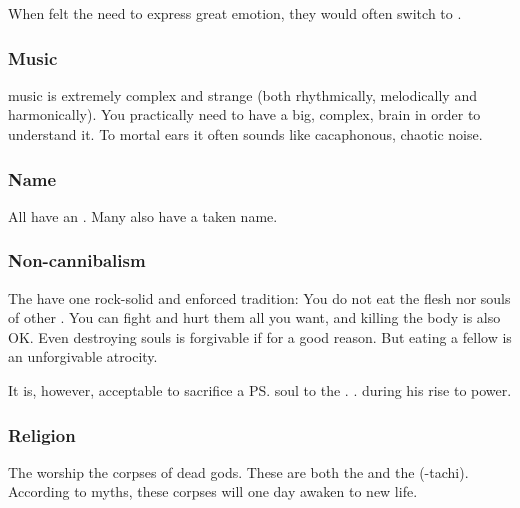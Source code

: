 When \dragons felt the need to express great emotion, they would often switch to \TrueDraconic. 





\subsubsection{Music}
\Draconic{} music is extremely complex and strange (both rhythmically, melodically and harmonically). 
You practically need to have a big, complex, \draconic{} brain in order to understand it. 
To mortal ears it often sounds like cacaphonous, chaotic noise. 





\subsubsection{Name}
All \dragons{} have an . 
Many also have a taken name. 





\subsubsection{Non-cannibalism}
The \dragons{} have one rock-solid and enforced tradition: 
You do not eat the flesh nor souls of other \dragons. 
You can fight and hurt them all you want, and killing the body is also OK. 
Even destroying souls is forgivable if for a good reason. 
But eating a fellow \dragon{} is an unforgivable atrocity. 

It is, however, acceptable to sacrifice a \ps{\dragon} soul to the \xss. 
\TyarithXserasshana{} . 
\IrocasSecherdamon{}  during his rise to power. 









\subsubsection{Religion}
The \dragons{} worship the corpses of dead gods. 
These are both the  and the \firstgendragons{} (\Tiamat-tachi). 
According to myths, these corpses will one day awaken to new life. 

